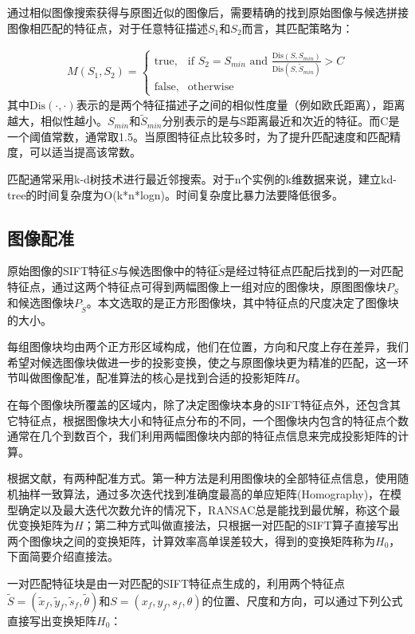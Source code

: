 \documentclass[UTF8]{csoarticle}
\begin{document}
通过相似图像搜索获得与原图近似的图像后，需要精确的找到原始图像与候选拼接图像相匹配的特征点，对于任意特征描述\(S_1\)和\(S_2\)而言，其匹配策略为：

\begin{align}
  M(S_1,S_2) = 
\begin{cases} 
\text{true}, & \mbox{if } S_2 = S_{min}\text{ and }\frac{\text{Dis}(S,S_{min})}{\text{Dis}(S,\tilde{S}_{min})} > C \\
\text{false}, & \mbox{otherwise}
\end{cases}
\end{align}
其中\(\text{Dis}(\cdot,\cdot)\)表示的是两个特征描述子之间的相似性度量（例如欧氏距离），距离越大，相似性越小。\(S_{min}\)和\(\tilde{S}_{min}\)分别表示的是与S距离最近和次近的特征。而C是一个阈值常数，通常取1.5。当原图特征点比较多时，为了提升匹配速度和匹配精度，可以适当提高该常数。

匹配通常采用k-d树技术进行最近邻搜索。对于n个实例的k维数据来说，建立kd-tree的时间复杂度为O(k*n*logn)。时间复杂度比暴力法要降低很多。

\subsection{图像配准}
原始图像的SIFT特征\(S\)与候选图像中的特征\(\tilde{S}\)是经过特征点匹配后找到的一对匹配特征点，通过这两个特征点可得到两幅图像上一组对应的图像块，原图图像块\(P_S\)和候选图像块\(P_{\tilde{S}}\)。本文选取的是正方形图像块，其中特征点的尺度决定了图像块的大小。

每组图像块均由两个正方形区域构成，他们在位置，方向和尺度上存在差异，我们希望对候选图像块做进一步的投影变换，使之与原图像块更为精准的匹配，这一环节叫做图像配准，配准算法的核心是找到合适的投影矩阵\(H\)。

在每个图像块所覆盖的区域内，除了决定图像块本身的SIFT特征点外，还包含其它特征点，根据图像块大小和特征点分布的不同，一个图像块内包含的特征点个数通常在几个到数百个，我们利用两幅图像块内部的特征点信息来完成投影矩阵的计算。

根据文献\cite{Dai:2012vn}，有两种配准方式。第一种方法是利用图像块的全部特征点信息，使用随机抽样一致算法，通过多次迭代找到准确度最高的单应矩阵(Homography)，在模型确定以及最大迭代次数允许的情况下，RANSAC总是能找到最优解，称这个最优变换矩阵为\(H\)；第二种方式叫做直接法，只根据一对匹配的SIFT算子直接写出两个图像块之间的变换矩阵，计算效率高单误差较大，得到的变换矩阵称为\(H_0\)，下面简要介绍直接法。

一对匹配特征块是由一对匹配的SIFT特征点生成的，利用两个特征点\(\tilde{S}=(\tilde{x}_f,\tilde{y}_f,\tilde{s}_f,\tilde{\theta})\)和\(S=(x_f,y_f,s_f,\theta)\)的位置、尺度和方向，可以通过下列公式直接写出变换矩阵\(H_0\)：
\end{document}
